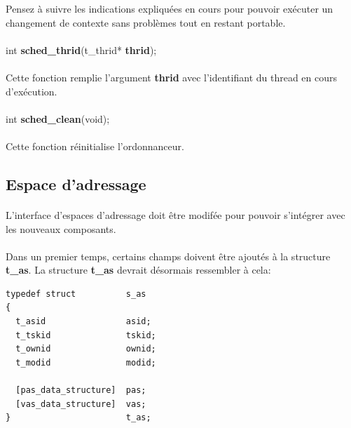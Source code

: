 \documentclass[10pt,a4wide]{article}
\begin{document}
Pensez \`a suivre les indications expliqu\'ees en cours pour pouvoir
ex\'ecuter un changement de contexte sans probl\`emes tout en restant
portable.

\paragraph{}

\hspace{1.5cm}int \textbf{sched\_thrid}(t\_thrid* \textbf{thrid});

\paragraph{}

Cette fonction remplie l'argument \textbf{thrid} avec l'identifiant du
thread en cours d'ex\'ecution.

\paragraph{}

\hspace{1.5cm}int \textbf{sched\_clean}(void);

\paragraph{}

Cette fonction r\'einitialise l'ordonnanceur.

\subsection{Espace d'adressage}

\paragraph{}

L'interface d'espaces d'adressage doit \^etre modif\'ee pour pouvoir
s'int\'egrer avec les nouveaux composants.

\paragraph{}

Dans un premier temps, certains champs doivent \^etre ajout\'es \`a
la structure \textbf{t\_as}. La structure \textbf{t\_as} devrait
d\'esormais ressembler \`a cela:

\begin{verbatim}
typedef struct          s_as
{
  t_asid                asid;
  t_tskid               tskid;
  t_ownid               ownid;
  t_modid               modid;

  [pas_data_structure]  pas;
  [vas_data_structure]  vas;
}                       t_as;
\end{verbatim}
\end{document}
